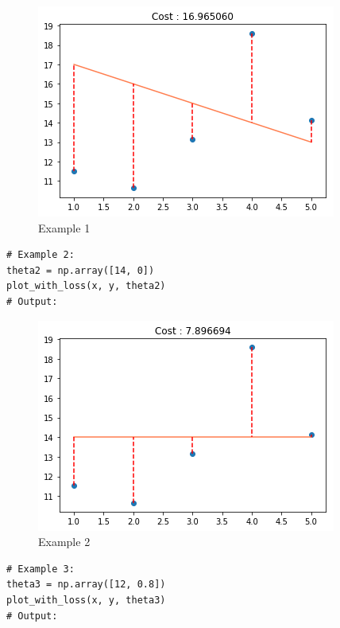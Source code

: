 \documentclass{42-en}
\begin{document}
\begin{figure}[H]
  \centering
  \includegraphics[scale=0.65]{assets/plotcost1.png}
  \caption{Example 1}
\end{figure}

\begin{verbatim}
# Example 2:
theta2 = np.array([14, 0])
plot_with_loss(x, y, theta2)
# Output:
\end{verbatim}

\begin{figure}[H]
  \centering
  \includegraphics[scale=0.65]{assets/plotcost2.png}
  \caption{Example 2}
\end{figure}

\newpage

\begin{verbatim}
# Example 3:
theta3 = np.array([12, 0.8])
plot_with_loss(x, y, theta3)
# Output:
\end{verbatim}
\end{document}
